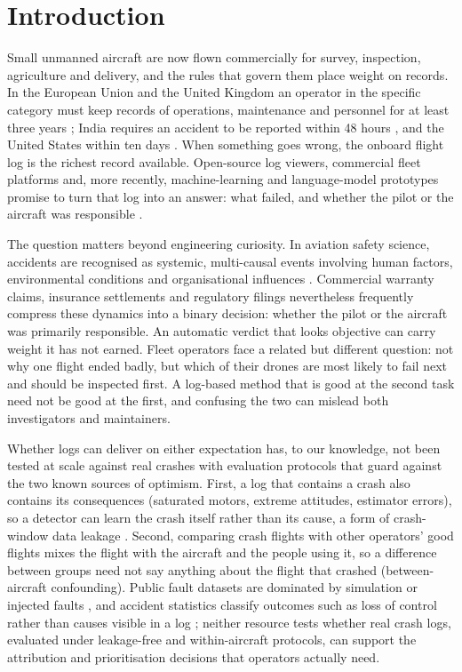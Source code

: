 \documentclass[preprint,12pt]{elsarticle}
\begin{document}
\section{Introduction}
\label{sec:intro}

Small unmanned aircraft are now flown commercially for survey, inspection, agriculture and delivery, and the rules
that govern them place weight on records. In the European Union and the United Kingdom an operator in the specific
category must keep records of operations, maintenance and personnel for at least three years
\cite{eu2019947,easa2024ear}; India requires an accident to be reported within 48 hours \cite{india2021rules}, and
the United States within ten days \cite{faa107}. When something goes wrong, the onboard flight log is the richest
record available. Open-source log viewers, commercial fleet platforms and, more recently, machine-learning and
language-model prototypes promise to turn that log into an answer: what failed, and whether the pilot or the aircraft
was responsible \cite{duvvuru2025llm,silalahi2026droptc}.

The question matters beyond engineering curiosity. In aviation safety science, accidents are recognised as systemic,
multi-causal events involving human factors, environmental conditions and organisational influences \cite{wiegmann2003hfacs}.
Commercial warranty claims, insurance settlements and regulatory filings nevertheless frequently compress these dynamics
into a binary decision: whether the pilot or the aircraft was primarily responsible. An automatic verdict that looks
objective can carry weight it has not earned. Fleet operators face a related but different question: not why one flight
ended badly, but which of their drones are most likely to fail next and should be inspected first. A log-based method that
is good at the second task need not be good at the first, and confusing the two can mislead both investigators and maintainers.

Whether logs can deliver on either expectation has, to our knowledge, not been tested at scale against real crashes
with evaluation protocols that guard against the two known sources of optimism. First, a log that contains a crash also
contains its consequences (saturated motors, extreme attitudes, estimator errors), so a detector can learn the crash
itself rather than its cause, a form of crash-window data leakage
\cite{kaufman2012leakage,kapoor2023leakage}. Second, comparing crash flights with other operators' good flights mixes
the flight with the aircraft and the people using it, so a difference between groups need not say anything about the
flight that crashed (between-aircraft confounding). Public fault datasets are dominated by simulation or injected faults
\cite{keipour2021alfa,le2025rflymad,kabaoglu2026uavsead}, and accident statistics classify outcomes such as loss of
control rather than causes visible in a log \cite{wild2016drone,aaib2024review}; neither resource tests
whether real crash logs, evaluated under leakage-free and within-aircraft protocols, can support the attribution and
prioritisation decisions that operators actually need.
\end{document}
